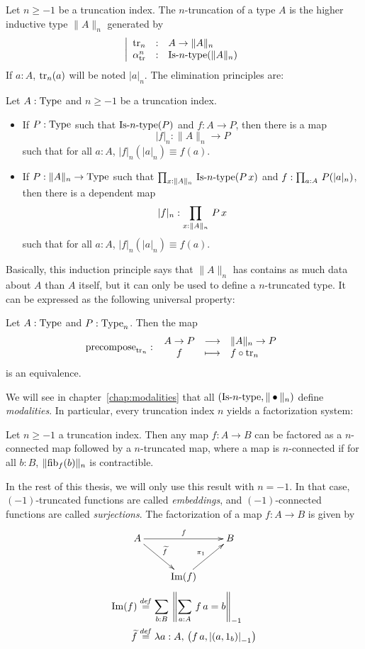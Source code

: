 Let $n\geqslant -1$ be a truncation index. The $n$-truncation of a
type $A$ is the
higher inductive type $\|A\|_n$ 
 generated by
\[
  \left|
    \begin{array}{lll}
      \operatorname{tr}_n &:& A \to \|A\|_n \\
      \alpha_{\operatorname{tr}}^n &:& \mathop{\mathrm{Is{\hbox{-}}}n\mathrm{{\hbox{-}} type}} (\|A\|_n)
    \end{array}
  \right.
\]
If $a:A$, $\operatorname{tr}_n(a)$ will be noted $|a|_n$.
The elimination principles are:
\begin{lem}\label{lem:trunc_elim}
  Let $A:\operatorname{Type}$ and $n\geqslant -1$ be a truncation index.
  \begin{itemize}
  \item If $P:\operatorname{Type}$ such that $\mathop{\mathrm{Is{\hbox{-}}}n\mathrm{{\hbox{-}} type}}(P)$ and $f:A \to P$, then
    there is a map
    \[|f|_n : \|A\|_n \to P\]
    such that for all $a:A$, $|f|_n(|a|_n) \equiv f(a)$.
  \item If $P:\|A\|_n \to \operatorname{Type}$ such that $\prod_{x:\|A\|_n}\, \mathop{\mathrm{Is{\hbox{-}}}n\mathrm{{\hbox{-}} type}} (P\, x)$ and $f:\prod_{a:A}\, P(|a|_n)$, then there is
    a dependent map
    \[|f|_n : \prod_{x:\|A\|_n}\, P\, x\]
    such that for all $a:A$, $|f|_n(|a|_n) \equiv f(a)$.
  \end{itemize}
\end{lem}
Basically, this induction principle says that $\|A\|_n$ has contains
as much data about $A$ than $A$ itself, but it can only be used to
define a $n$-truncated type. It can be expressed as the following
universal property:
\begin{lem}
  Let $A:\operatorname{Type}$ and $P:\operatorname{Type}_n$. Then the map
\[
  \operatorname{\mathrm{precompose}}_{\operatorname{tr}_n} \, \colon \left. \begin{array}{ccl} A\to P & \longrightarrow & \|A\|_n \to P \\ f & \longmapsto & f \circ \operatorname{tr}_n \end{array} \right.
\]
is an equivalence.
\end{lem}
We will see in chapter~\ref{chap:modalities} that all $(\mathop{\mathrm{Is{\hbox{-}}}n\mathrm{{\hbox{-}} type}},\|\bullet\|_n)$ define {\em modalities}. In particular, every
truncation index $n$ yields a factorization system:

\begin{prop}
  Let $n\geqslant -1$ a truncation index. Then any map $f:A\to B$ can
  be factored as a $n$-connected map followed by a $n$-truncated map,
  where a map is $n$-connected if for all $b:B$, $\|\mathrm{fib}_{f}(b)\|_n$ is contractible.
\end{prop}

In the rest of this thesis, we will only use this result with
$n=-1$. In that case, $(-1)$-truncated functions are called {\em
  embeddings}, and $(-1)$-connected functions are called {\em
  surjections}. The factorization of a map $f:A\to B$ is given by
\[
  \xymatrix{
    A \ar[rr]^f \ar[rd]^{\widetilde f} && B \\
    & \im(f)  \ar[ru]^{\pi_1} &
  }
\]
\begin{align*}
  \operatorname{Im}(f) &\overset{de\hspace{-0.2ex}f}{=} \sum_{b:B}\, \left\| \sum_{a:A}\, f\, a = b
  \right\|_{-1} \\
  \widetilde f &\overset{de\hspace{-0.2ex}f}{=} \lambda a:A,\, \left(f\, a,\left|(a,1_b)\right|_{-1}\right)
\end{align*}

